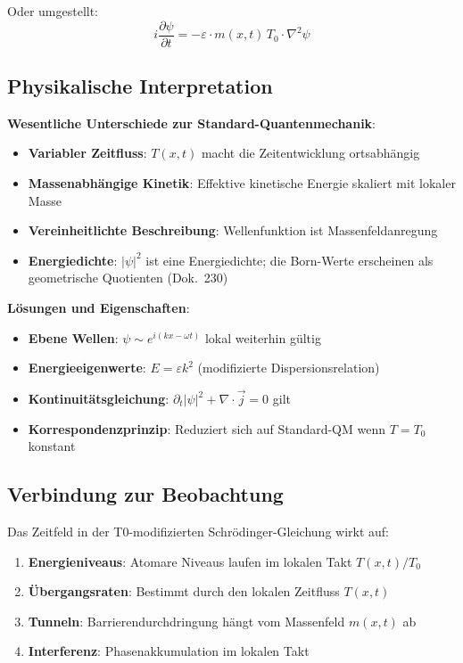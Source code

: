 	Oder umgestellt:
	\begin{equation}
		i \frac{\partial\psi}{\partial t} = -\varepsilon \cdot m(x,t)\,T_0 \cdot \nabla^2 \psi
		\label{eq:t0_schrodinger_rearranged}
	\end{equation}
	
	\subsection{Physikalische Interpretation}
	
	\textbf{Wesentliche Unterschiede zur Standard-Quantenmechanik}:
	\begin{itemize}
		\item \textbf{Variabler Zeitfluss}: $T(x,t)$ macht die Zeitentwicklung ortsabhängig
		\item \textbf{Massenabhängige Kinetik}: Effektive kinetische Energie skaliert mit lokaler Masse
		\item \textbf{Vereinheitlichte Beschreibung}: Wellenfunktion ist Massenfeldanregung
		\item \textbf{Energiedichte}: $|\psi|^2$ ist eine Energiedichte; die Born-Werte erscheinen als geometrische Quotienten (Dok.~230)
	\end{itemize}
	
	\textbf{Lösungen und Eigenschaften}:
	\begin{itemize}
		\item \textbf{Ebene Wellen}: $\psi \sim e^{i(kx - \omega t)}$ lokal weiterhin gültig
		\item \textbf{Energieeigenwerte}: $E = \varepsilon k^2$ (modifizierte Dispersionsrelation)
		\item \textbf{Kontinuitätsgleichung}: $\partial_t|\psi|^2 + \nabla \cdot \vec{j} = 0$ gilt
		\item \textbf{Korrespondenzprinzip}: Reduziert sich auf Standard-QM wenn $T = T_0$ konstant
	\end{itemize}
	
	\subsection{Verbindung zur Beobachtung}
	
	Das Zeitfeld in der T0-modifizierten Schrödinger-Gleichung wirkt auf:
	
	\begin{enumerate}
		\item \textbf{Energieniveaus}: Atomare Niveaus laufen im lokalen Takt $T(x,t)/T_0$
		\item \textbf{Übergangsraten}: Bestimmt durch den lokalen Zeitfluss $T(x,t)$
		\item \textbf{Tunneln}: Barrierendurchdringung hängt vom Massenfeld $m(x,t)$ ab
		\item \textbf{Interferenz}: Phasenakkumulation im lokalen Takt
	\end{enumerate}
	
